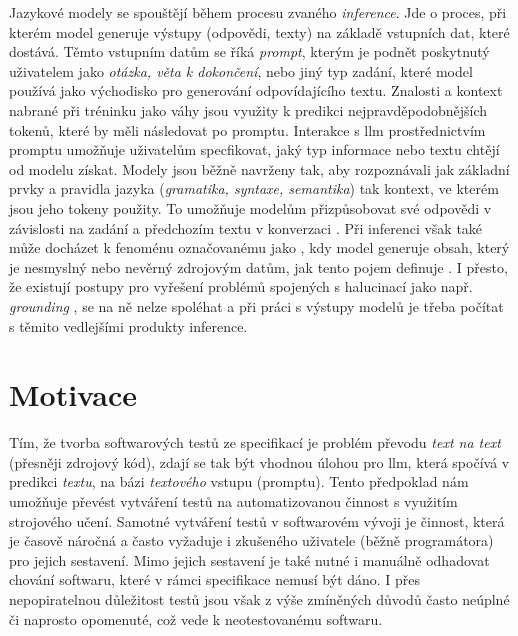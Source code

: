 \documentclass[czech, ma, kiv, he, iso690numb, pdf, viewonly]{fasthesis}
\begin{document}
    Jazykové modely se spouštějí během procesu zvaného \textit{inference}. Jde o proces, při kterém model generuje výstupy (odpovědi, texty) na základě vstupních dat, které dostává. Těmto vstupním datům se říká \textit{prompt}, kterým je podnět poskytnutý uživatelem jako \textit{otázka, věta k dokončení}, nebo jiný typ zadání, které model používá jako východisko pro generování odpovídajícího textu. Znalosti a kontext nabrané při tréninku jako váhy jsou využity k predikci nejpravděpodobnějších tokenů, které by měli následovat po promptu. Interakce s \Gls{llm} prostřednictvím promptu umožňuje uživatelům specfikovat, jaký typ informace nebo textu chtějí od modelu získat. Modely jsou běžně navrženy tak, aby rozpoznávali jak základní prvky a pravidla jazyka (\textit{gramatika, syntaxe, semantika}) tak kontext, ve kterém jsou jeho tokeny použity. To umožňuje modelům přizpůsobovat své odpovědi v závislosti na zadání a předchozím textu v konverzaci \cite{pasekprazak2022}. Při inferenci však také může docházet k fenoménu označovanému jako , kdy model generuje obsah, který je nesmyslný nebo nevěrný zdrojovým datům, jak tento pojem definuje \cite{filippova2020controlled}. I přesto, že existují postupy pro vyřešení problémů spojených s halucinací jako např. \textit{grounding} \cite{microsoft2023grounding}, se na ně nelze spoléhat a při práci s výstupy modelů je třeba počítat s těmito vedlejšími produkty inference.

    \pagebreak
    \section{Motivace} \label{sec:motivation}

    Tím, že tvorba softwarových testů ze specifikací je problém převodu \emph{text na text} (přesněji zdrojový kód), zdají se tak být vhodnou úlohou pro \Gls{llm}, která spočívá v predikci \emph{textu}, na bázi \emph{textového} vstupu (promptu). Tento předpoklad nám umožňuje převést vytváření testů na automatizovanou činnost s využitím strojového učení. Samotné vytváření testů v softwarovém vývoji je činnost, která je časově náročná a často vyžaduje i zkušeného uživatele (běžně programátora) pro jejich sestavení. Mimo jejich sestavení je také nutné i manuálně odhadovat chování softwaru, které v rámci specifikace nemusí být dáno. I přes nepopiratelnou důležitost testů jsou však z výše zmíněných důvodů často neúplné či naprosto opomenuté, což vede k neotestovanému softwaru.
\end{document}

